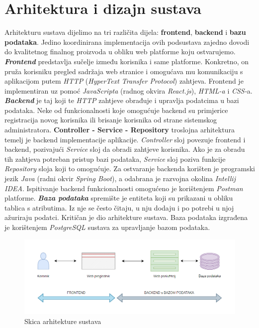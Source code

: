 \chapter{Arhitektura i dizajn sustava}

\noindent Arhitekturu sustava dijelimo na tri različita dijela: \textbf{frontend}, \textbf{backend} i \textbf{bazu podataka}. Jedino koordinirana implementacija ovih podsustava zajedno dovodi do kvalitetnog finalnog proizvoda u obliku web platforme koju ostvarujemo. 
\newline \newline
\noindent \textbf{\textit{Frontend}} predstavlja sučelje između korisnika i same platforme. Konkretno, on pruža korisniku pregled sadržaja web stranice i omogućava mu komunikaciju s aplikacijom putem \textit{HTTP} (\textit{HyperText Transfer Protocol}) zahtjeva. Frontend je implementiran uz pomoć \textit{JavaScripta} (radnog okvira \textit{React.js}), \textit{HTML-a} i \textit{CSS-}a.
\newline\newline\noindent \textbf{\textit{Backend}} je taj koji te \textit{HTTP} zahtjeve obrađuje i upravlja podatcima u bazi podataka. Neke od funkcionalnosti koje omogućuje backend su primjerice registracija novog korisnika ili brisanje korisnika od strane sistemskog administratora. \textbf{Controller - Service - Repository} troslojna arhitektura temelj je backend implementacije aplikacije. \textit{Controller} sloj povezuje frontend i backend, pozivajući \textit{Service} sloj da obradi zahtjeve korisnika. Ako je za obradu tih zahtjeva potreban pristup bazi podataka, \textit{Service} sloj poziva funkcije \textit{Repository} sloja koji to omogućuje. Za ostvaranje backenda korišten je programski jezik \textit{Java} (radni okvir \textit{Spring Boot}), a odabrana je razvojna okolina \textit{Intellij IDEA}. Ispitivanje backend funkcionalnosti omogućeno je korištenjem \textit{Postman} platforme.
\newline\newline\noindent \textbf{\textit{Baza podataka}} spremište je entiteta koji su prikazani u obliku tablica s atributima. Iz nje se često čitaju, u nju dodaju i po potrebi u njoj ažuriraju podatci. Kritičan je dio arhitekture sustava. Baza podataka izgrađena je korištenjem \textit{PostgreSQL} sustava za upravljanje bazom podataka.

			\begin{figure}[H]
			    \centering
			    \includegraphics[width=1\linewidth]{slike/skica_arhitekture.png}
			    \caption{Skica arhitekture sustava}
			    \label{fig:enter-label}
			\end{figure}
   
